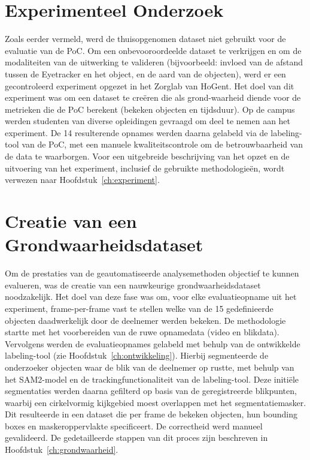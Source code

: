 \section{Experimenteel Onderzoek}

Zoals eerder vermeld, werd de thuisopgenomen dataset niet gebruikt voor de evaluatie van de PoC. 
Om een onbevooroordeelde dataset te verkrijgen en om de modaliteiten van de uitwerking te valideren (bijvoorbeeld: invloed van de afstand tussen de Eyetracker en het object, en de aard van de objecten), werd er een gecontroleerd experiment opgezet in het Zorglab van HoGent.
Het doel van dit experiment was om een dataset te creëren die als grond-waarheid diende voor de metrieken die de PoC berekent (bekeken objecten en tijdsduur).
Op de campus werden studenten van diverse opleidingen gevraagd om deel te nemen aan het experiment.
De 14 resulterende opnames werden daarna gelabeld via de labeling-tool van de PoC, met een manuele kwaliteitscontrole om de betrouwbaarheid van de data te waarborgen.
Voor een uitgebreide beschrijving van het opzet en de uitvoering van het experiment, inclusief de gebruikte methodologieën, wordt verwezen naar Hoofdstuk~\ref{ch:experiment}.

\section{Creatie van een Grondwaarheidsdataset}

Om de prestaties van de geautomatiseerde analysemethoden objectief te kunnen evalueren, was de creatie van een nauwkeurige 
grondwaarheidsdataset noodzakelijk. Het doel van deze fase was om, voor elke evaluatieopname uit het experiment, 
frame-per-frame vast te stellen welke van de 15 gedefinieerde objecten daadwerkelijk door de deelnemer werden bekeken. 
De methodologie startte met het voorbereiden van de ruwe opnamedata (video en blikdata). 
Vervolgens werden de evaluatieopnames gelabeld met behulp van de ontwikkelde labeling-tool (zie Hoofdstuk~\ref{ch:ontwikkeling}).
Hierbij segmenteerde de onderzoeker objecten waar de blik van de deelnemer op rustte, met behulp van het SAM2-model en de trackingfunctionaliteit van de labeling-tool.
Deze initiële segmentaties werden daarna gefilterd op basis van de geregistreerde blikpunten, waarbij een cirkelvormig kijkgebied moest overlappen met het segmentatiemasker. 
Dit resulteerde in een dataset die per frame de bekeken objecten, hun bounding boxes en maskeroppervlakte specificeert. 
De correctheid werd manueel gevalideerd. De gedetailleerde stappen van dit proces zijn beschreven in Hoofdstuk~\ref{ch:grondwaarheid}.

